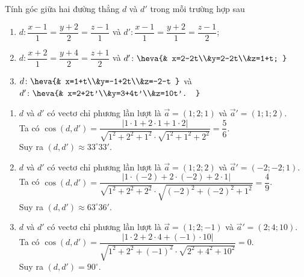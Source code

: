 \begin{bt}%

	Tính góc giữa hai đường thẳng $d$ và $d'$ trong mỗi trường hợp sau
	\begin{enumerate}
		\item $d\colon\dfrac{x-1}{1}=\dfrac{y+2}{2}=\dfrac{z-1}{1}$ và $d'\colon\dfrac{x-1}{1}=\dfrac{y+2}{1}=\dfrac{z-1}{2}$;
		\item $d\colon\dfrac{x+2}{1}=\dfrac{y+4}{2}=\dfrac{z+1}{2}$ và $d'\colon\heva{& x=2-2t\\&y=2-2t\\&z=1+t; }$
		\item $d\colon\heva{& x=1+t\\&y=-1+2t\\&z=-2-t }$ và $d'\colon\heva{& x=2+2t'\\&y=3+4t'\\&z=10t'. }$
	\end{enumerate}
	\loigiai
	{
		\begin{enumerate}
			\item $d$ và $d'$ có vectơ chỉ phương lần lượt là $\overrightarrow{a}=(1;2;1)$ và $\overrightarrow{a}'=(1;1;2)$.\\
			Ta có $\cos (d,d')=\dfrac{\left |1\cdot 1+2\cdot 1+1\cdot 2 \right |}{\sqrt{1^2+2^2+1^2}\cdot\sqrt{1^2+1^2+2^2}}=\dfrac{5}{6}$.\\
			Suy ra $(d,d')\approx 33^{\circ}33'$.
			\item $d$ và $d'$ có vectơ chỉ phương lần lượt là $\overrightarrow{a}=(1;2;2)$ và $\overrightarrow{a}'=(-2;-2;1)$.\\
			Ta có $\cos (d,d')=\dfrac{\left |1\cdot (-2)+2\cdot (-2)+2\cdot 1 \right |}{\sqrt{1^2+2^2+2^2}\cdot\sqrt{(-2)^2+(-2)^2+1^2}}=\dfrac{4}{9}$.\\
			Suy ra $(d,d')\approx 63^{\circ}36'$.
			\item $d$ và $d'$ có vectơ chỉ phương lần lượt là $\overrightarrow{a}=(1;2;-1)$ và $\overrightarrow{a}'=(2;4;10)$.\\
			Ta có $\cos (d,d')=\dfrac{\left |1\cdot 2+2\cdot 4+(-1)\cdot 10 \right |}{\sqrt{1^2+2^2+(-1)^2}\cdot\sqrt{2^2+4^2+10^2}}=0$.\\
			Suy ra $(d,d')=90^{\circ}$.
		\end{enumerate}
	}
\end{bt}

